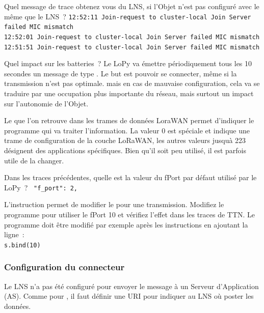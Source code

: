     
{Quel message de trace obtenez vous du LNS, si l'Objet n'est pas configuré avec le même  que le LNS~?}
{
\texttt{12:52:11 Join-request to cluster-local Join Server failed MIC mismatch}\\
\texttt{12:52:01 Join-request to cluster-local Join Server failed MIC mismatch}\\
\texttt{12:51:51 Join-request to cluster-local Join Server failed MIC mismatch}\\

}

{Quel impact sur les batteries~?}
{Le LoPy va émettre périodiquement tous les 10 secondes un message de type . Le but est pouvoir se connecter, même si la transmission n'est pas optimale. mais en cas de mauvaise configuration, cela va se traduire par une occupation plus importante du réseau, mais surtout un impact sur l'autonomie de l'Objet.}

Le  que l'on retrouve dans les trames de données LoraWAN permet d'indiquer le programme qui va traiter l'information. La valeur 0 est spéciale et indique une trame de configuration de la couche LoRaWAN, les autres valeurs jusquà 223 désignent des applications spécifiques. Bien qu'il soit peu utilisé, il est parfois utile de la changer. 

{Dans les traces précédentes, quelle est la valeur du fPort par défaut utilisé par le LoPy~? }
{\texttt{  "f\_port": 2,}}

{L'instruction  permet de modifier le  pour une transmission. Modifiez le programme pour utiliser le fPort 10 et vérifiez l'effet dans les traces de TTN. }
{Le programme doit être modifié par exemple après les instructions  en ajoutant la ligne~:\\
\texttt{s.bind(10)}\\
}

\subsubsection{Configuration du connecteur}

Le LNS n'a pas été configuré pour envoyer le message à un Serveur d'Application (\acl{AS}). Comme pour , il faut définir une URI pour indiquer au LNS où poster les données.

         \vspace{1em}


